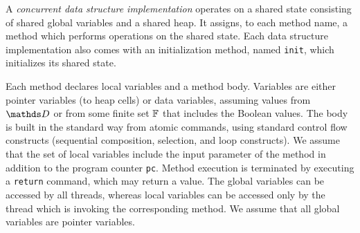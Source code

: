 
A {\em concurrent data structure implementation} operates on a shared
state consisting of shared global variables and a shared heap.
It assigns, to each method name, a method which performs operations
%
on the shared state.
Each data structure implementation also comes with an initialization method,
named {\tt init}, which initializes its shared state.

%
Each method declares local variables
  and a method body.
%
Variables are either pointer variables (to heap cells) or data variables, assuming values from $\ddomain$ or from some finite set $\mathbb{F}$ that includes the Boolean values.
%
%
The body is built in the standard way
from atomic commands, using standard control
flow constructs (sequential composition, selection, and loop constructs).
%
%
We assume that the set of local variables include the input
parameter of the method
in addition to the program counter {\tt pc}.
%
Method execution is terminated by executing a {\tt return} command,
which may return a value.
The global variables can be
accessed by all threads, whereas local variables can be accessed only
by the thread which is invoking the corresponding method.
%
We assume that all global variables are pointer variables.

